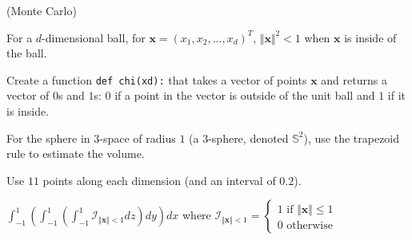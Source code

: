 \documentclass[12pt,letterpaper,noanswers]{exam}
\begin{document}
\begin{questions}




\item (Monte Carlo)

For a $d$-dimensional ball, for $\mathbf{x} = (x_1, x_2, ..., x_d)^T$, $\Vert\mathbf{x}\Vert^2 < 1$ when $\mathbf{x}$ is inside of the ball.



\begin{parts}
\item Create a function \texttt{def chi(xd):} that takes a vector of points $\mathbf{x}$ and returns a vector of $0$s and $1$s: $0$ if a point in the vector is outside of the unit ball and $1$ if it is inside.


\item For the sphere in $3$-space of radius $1$ (a $3$-sphere, denoted $\mathbb{S}^2$), use the trapezoid rule to estimate the volume.

Use $11$ points along each dimension (and an interval of $0.2$).


$\displaystyle\int_{-1}^1\left(\int_{-1}^1\left(\int_{-1}^1 \mathcal{I}_{\Vert \mathbf{x}\Vert <1} dz \right)dy\right)dx$ where $\mathcal{I}_{\Vert \mathbf{x}\Vert <1} = \left\{\begin{array}{l}1 \text{ if } \Vert \mathbf{x}\Vert\leq 1 \\
0 \text{ otherwise}\end{array}\right.$


\end{parts}
\end{questions}
\end{document}
